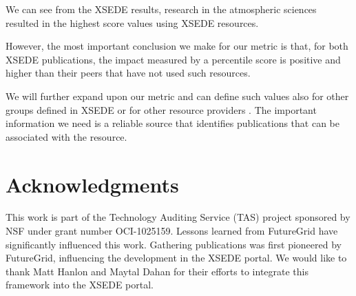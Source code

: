 \documentclass{sig-alternate}
\begin{document}
We can see from the XSEDE results, research in the atmospheric sciences resulted in the highest score values using XSEDE resources. 

However, the most important conclusion we make for our metric is that, for both XSEDE publications, the impact measured by a percentile score is positive and higher than their peers that have not used such resources. 

We will further expand upon our metric and can define such values also for other groups defined in XSEDE or for other resource providers \cite{las2015cluster}. The important information we need is a reliable source that identifies publications that can be associated with the resource.


\section{Acknowledgments}

 
This work is part of the Technology Auditing Service (TAS) project sponsored by NSF under grant number OCI-1025159. Lessons learned from FutureGrid have significantly influenced this work. Gathering publications was first pioneered by FutureGrid, influencing the development in the XSEDE portal. We would like to thank Matt Hanlon and Maytal Dahan for their efforts to integrate this framework into the XSEDE portal. 
\end{document}
